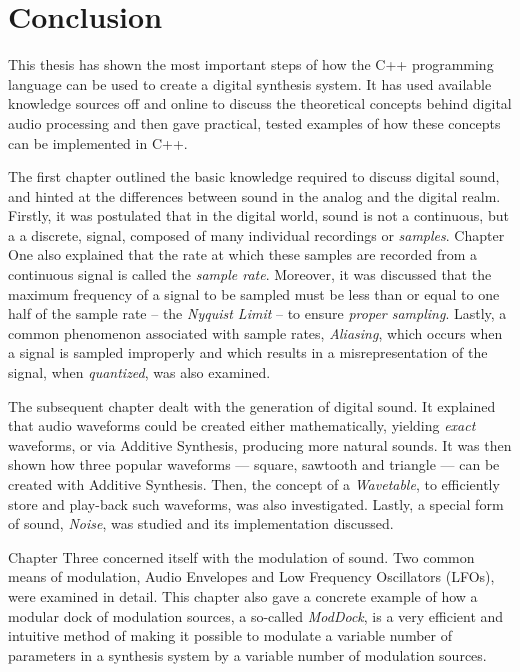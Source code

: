 \chapter*{Conclusion}

This thesis has shown the most important steps of how the C++ programming language can be used to create a digital synthesis system. It has used available knowledge sources off and online to discuss the theoretical concepts behind digital audio processing and then gave practical, tested examples of how these concepts can be implemented in C++. \vspace{\baselineskip}

The first chapter outlined the basic knowledge required to discuss digital sound, and hinted at the differences between sound in the analog and the digital realm. Firstly, it was postulated that in the digital world, sound is not a continuous, but a a discrete, signal, composed of many individual recordings or \emph{samples}. Chapter One also explained that the rate at which these samples are recorded from a continuous signal is called the \emph{sample rate}. Moreover, it was discussed that the maximum frequency of a signal to be sampled must be less than or equal to one half of the sample rate -- the \emph{Nyquist Limit} -- to ensure \emph{proper sampling}. Lastly, a common phenomenon associated with sample rates, \emph{Aliasing}, which occurs when a signal is sampled improperly and which results in a misrepresentation of the signal, when \emph{quantized}, was also examined. \vspace{\baselineskip}

The subsequent chapter dealt with the generation of digital sound. It explained that audio waveforms could be created either mathematically, yielding \emph{exact} waveforms, or via Additive Synthesis, producing more natural sounds. It was then shown how three popular waveforms --- square, sawtooth and triangle --- can be created with Additive Synthesis. Then, the concept of a \emph{Wavetable}, to efficiently store and play-back such waveforms, was also investigated. Lastly, a special form of sound, \emph{Noise}, was studied and its implementation discussed. \vspace{\baselineskip}

Chapter Three concerned itself with the modulation of sound. Two common means of modulation, Audio Envelopes and Low Frequency Oscillators (LFOs), were examined in detail. This chapter also gave a concrete example of how a modular dock of modulation sources, a so-called \emph{ModDock}, is a very efficient and intuitive method of making it possible to modulate a variable number of parameters in a synthesis system by a variable number of modulation sources. \vspace{\baselineskip}

